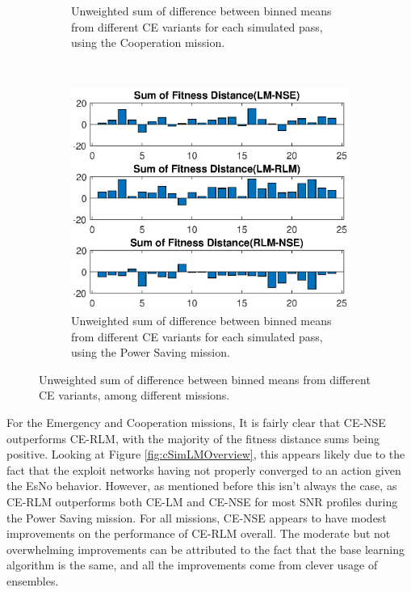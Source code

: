 \begin{figure}[ht]
\begin{subfigure}{0.55\linewidth}
	\caption{Unweighted sum of difference between binned means from different CE variants for each simulated pass, using the Cooperation mission.}
	\label{fig:cSimUnweightCoop}
\end{subfigure}\\
\begin{center}
\begin{subfigure}{0.55\linewidth}
	\centering
	\includegraphics[scale=0.6]{figures/c_sim_results/power_unweighted_sumFitness.eps}
	\caption{Unweighted sum of difference between binned means from different CE variants for each simulated pass, using the Power Saving mission.}
	\label{fig:cSimUnweightPower}
\end{subfigure}
\end{center}
\caption{Unweighted sum of difference between binned means from different CE variants, among different missions.}
\label{fig:unweight_sumFit}
\end{figure}
\clearpage

\par For the Emergency and Cooperation missions, It is fairly clear that CE-NSE outperforms CE-RLM, with the majority of the fitness distance sums being positive. Looking at Figure \ref{fig:cSimLMOverview}, this appears likely due to the fact that the exploit networks having not properly converged to an action given the EsNo behavior. However, as mentioned before this isn't always the case, as CE-RLM outperforms both CE-LM and CE-NSE for most SNR profiles during the Power Saving mission. For all missions, CE-NSE appears to have modest improvements on the performance of CE-RLM overall. The moderate but not overwhelming improvements can be attributed to the fact that the base learning algorithm is the same, and all the improvements come from clever usage of ensembles.


